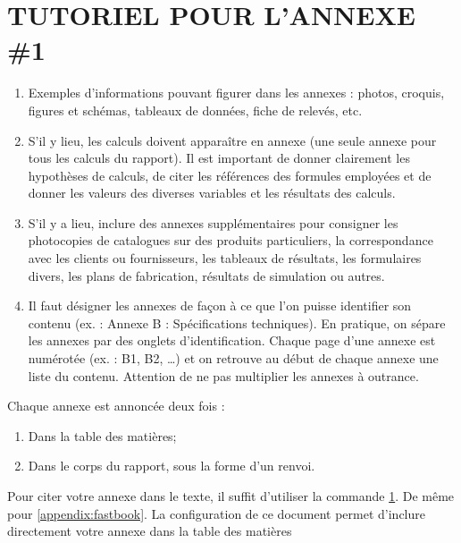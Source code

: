 \documentclass[12pt]{article} 	%
\begin{document}
\section{TUTORIEL POUR L'ANNEXE \#1}\label{appendix:consigne}
\begin{enumerate}
    \item Exemples d’informations pouvant figurer dans les annexes : photos, croquis, figures et schémas, tableaux de données, fiche de relevés, etc.
    \item S’il y lieu, les calculs doivent apparaître en annexe (une seule annexe pour tous les calculs du rapport). Il est important de donner clairement les hypothèses de calculs, de citer les références des formules employées et de donner les valeurs des diverses variables et les résultats des calculs.
    \item  S’il y a lieu, inclure des annexes supplémentaires pour consigner les photocopies de catalogues sur des produits particuliers, la correspondance avec les clients ou fournisseurs, les tableaux de résultats, les formulaires divers, les plans de fabrication, résultats de simulation ou autres.
    \item  Il faut désigner les annexes de façon à ce que l’on puisse identifier son contenu (ex. : Annexe B : Spécifications techniques). En pratique, on sépare les annexes par des onglets d’identification. Chaque page d’une annexe est numérotée (ex. : B1, B2, …) et on retrouve au début de chaque annexe une liste du contenu. Attention de ne pas multiplier les annexes à outrance.
\end{enumerate}
Chaque annexe est annoncée deux fois :
\begin{enumerate}
    \item Dans la table des matières;
    \item Dans le corps du rapport, sous la forme d’un renvoi.
\end{enumerate}

Pour citer votre annexe dans le texte, il suffit d'utiliser la commande \ref{appendix:consigne}. De même pour \ref{appendix:fastbook}. La configuration de ce document permet d'inclure directement votre annexe dans la table des matières
\end{document}
